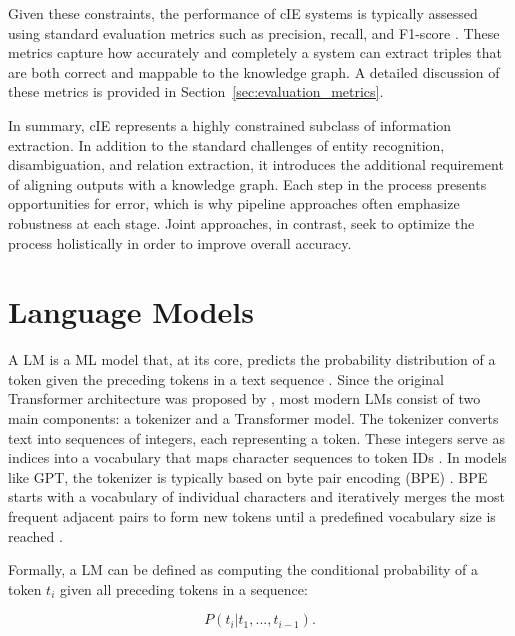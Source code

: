 \documentclass[a4paper,oneside,bibliography=totoc]{scrbook}
\begin{document}
Given these constraints, the performance of \ac{cIE} systems is typically assessed using standard evaluation metrics such as precision, recall, and F1-score \cite{Josifoski2021,Josifoski2023}. These metrics capture how accurately and completely a system can extract triples that are both correct and mappable to the knowledge graph. A detailed discussion of these metrics is provided in Section~\ref{sec:evaluation_metrics}.

In summary, \ac{cIE} represents a highly constrained subclass of information extraction. In addition to the standard challenges of entity recognition, disambiguation, and relation extraction, it introduces the additional requirement of aligning outputs with a knowledge graph. Each step in the process presents opportunities for error, which is why pipeline approaches often emphasize robustness at each stage. Joint approaches, in contrast, seek to optimize the process holistically in order to improve overall accuracy.

\section{Language Models}
\label{sec:language_models}

A \ac{LM} is a \ac{ML} model that, at its core, predicts the probability distribution of a token given the preceding tokens in a text sequence \cite{Radford2019}. Since the original Transformer architecture was proposed by \citet{Vaswani2023}, most modern \acp{LM} consist of two main components: a tokenizer and a Transformer model. The tokenizer converts text into sequences of integers, each representing a token. These integers serve as indices into a vocabulary that maps character sequences to token IDs \cite{Sennrich2016}. In models like GPT, the tokenizer is typically based on byte pair encoding (BPE) \cite{Radford2019}. BPE starts with a vocabulary of individual characters and iteratively merges the most frequent adjacent pairs to form new tokens until a predefined vocabulary size is reached \cite{Sennrich2016}.

Formally, a \ac{LM} can be defined as computing the conditional probability of a token $t_i$ given all preceding tokens in a sequence:

\begin{equation}
  P(t_i|t_1, ..., t_{i-1}).
\end{equation}
\end{document}
